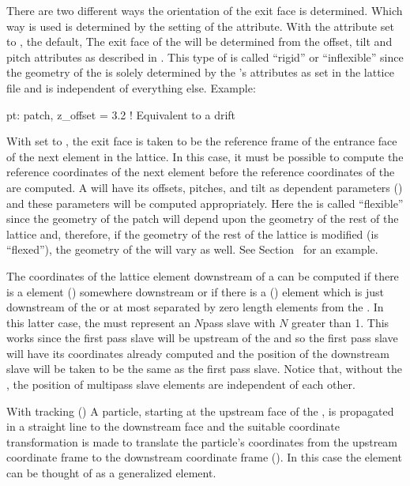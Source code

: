 {
There are two different ways the orientation of the exit face is determined. Which way is used is
determined by the setting of the  attribute.  With the  attribute set to
, the default, The exit face of the  will be determined from the offset, tilt
and pitch attributes as described in . This type of  is called
``rigid'' or ``inflexible'' since the geometry of the  is solely determined by the
's attributes as set in the lattice file and is independent of everything else. Example:
\begin{example}
  pt: patch, z_offset = 3.2   ! Equivalent to a drift
\end{example}

With  set to , the exit face is taken to be the reference frame of the
entrance face of the next element in the lattice. In this case, it must be possible to compute the
reference coordinates of the next element before the reference coordinates of the  are
computed. A   will have its offsets, pitches, and tilt as dependent
parameters () and these parameters will be computed appropriately. Here the
 is called ``flexible'' since the geometry of the patch will depend upon the geometry of
the rest of the lattice and, therefore, if the geometry of the rest of the lattice is modified (is
``flexed''), the geometry of the  will vary as well. See Section~ for an
example.

The coordinates of the lattice element downstream of a   can be computed
if there is a  element () somewhere downstream or if there is a
 () element which is just downstream of the  or at
most separated by zero length elements from the . In this latter case, the
 must represent an $N$\Th pass slave with $N$ greater than 1. This works since
the first pass slave will be upstream of the  and so the first pass slave will have its
coordinates already computed and the position of the downstream slave will be taken to be the same
as the first pass slave. Notice that, without the , the position of multipass slave
elements are independent of each other.

With  tracking () A particle, starting at the upstream face of the
, is propagated in a straight line to the downstream face and the suitable coordinate
transformation is made to translate the particle's coordinates from the upstream coordinate frame to
the downstream coordinate frame (). In this case the  element can be
thought of as a generalized  element.

}
